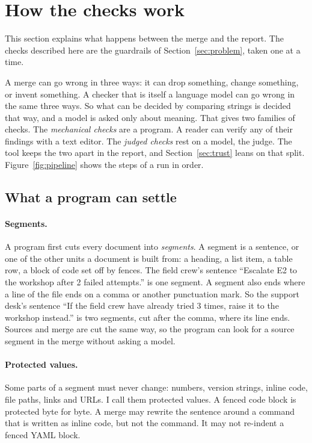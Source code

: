 \section{How the checks work}
\label{sec:system}

This section explains what happens between the merge and the report. The checks described here are the guardrails of Section~\ref{sec:problem}, taken one at a time.

A merge can go wrong in three ways: it can drop something, change something, or invent something. A checker that is itself a language model can go wrong in the same three ways. So what can be decided by comparing strings is decided that way, and a model is asked only about meaning. That gives two families of checks. The \emph{mechanical checks} are a program. A reader can verify any of their findings with a text editor. The \emph{judged checks} rest on a model, the judge. The tool keeps the two apart in the report, and Section~\ref{sec:trust} leans on that split. Figure~\ref{fig:pipeline} shows the steps of a run in order.



\subsection{What a program can settle}

\paragraph{Segments.} A program first cuts every document into \emph{segments}. A segment is a sentence, or one of the other units a document is built from: a heading, a list item, a table row, a block of code set off by fences. The field crew's sentence ``Escalate E2 to the workshop after 2 failed attempts.'' is one segment. A segment also ends where a line of the file ends on a comma or another punctuation mark. So the support desk's sentence ``If the field crew have already tried 3 times, raise it to the workshop instead.'' is two segments, cut after the comma, where its line ends. Sources and merge are cut the same way, so the program can look for a source segment in the merge without asking a model.

\paragraph{Protected values.} Some parts of a segment must never change: numbers, version strings, inline code, file paths, links and URLs. I call them protected values. A fenced code block is protected byte for byte. A merge may rewrite the sentence around a command that is written as inline code, but not the command. It may not re-indent a fenced YAML block.

